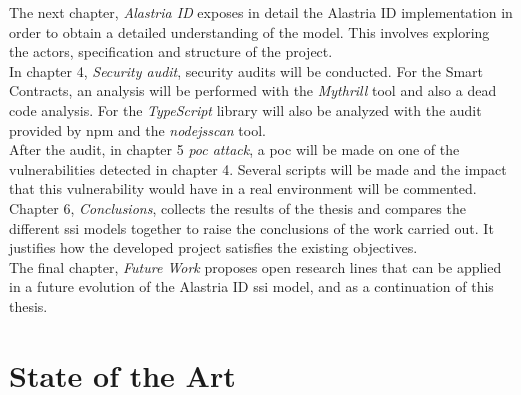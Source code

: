 \documentclass[a4paper, 12pt]{article} %
\begin{document}
            The next chapter, \textit{Alastria ID} exposes in detail the Alastria ID implementation in order to obtain a detailed understanding of the model. This involves exploring the actors, specification and structure of the project.\\
            
            In chapter 4, \textit{Security audit}, security audits will be conducted. For the Smart Contracts, an analysis will be performed with the \textit{Mythrill} tool and also a dead code analysis. For the \textit{TypeScript} library will also be analyzed with the audit provided by \acrshort{npm} and the \textit{nodejsscan} tool.\\
            
            After the audit, in chapter 5 \textit{\acrshort{poc} attack}, a \acrlong{poc} will be made on one of the vulnerabilities detected in chapter 4. Several scripts will be made and the impact that this vulnerability would have in a real environment will be commented.\\
            
            Chapter 6, \textit{Conclusions}, collects the results of the thesis and compares the different \acrshort{ssi} models together to raise the conclusions of the work carried out. It justifies how the developed project satisfies the existing objectives.\\
            
            The final chapter, \textit{Future Work} proposes open research lines that can be applied in a future evolution of the Alastria ID \acrshort{ssi} model, and as a continuation of this thesis.

\newpage
        
\section{State of the Art}
\end{document}
